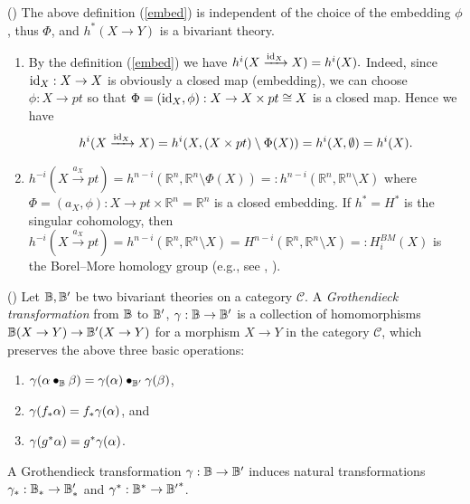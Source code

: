 \documentclass[a4paper]{amsart}
\begin{document}
\begin{thm}(\cite[p.34-p.38]{FM}) The above definition (\ref{embed}) is independent of the choice of the embedding $\phi$, thus $\Phi$, and $h^*(X \to Y)$ is a bivariant theory.
\end{thm}
\begin{rem} 
\begin{enumerate}
\item By the definition (\ref{embed}) we have
$h^i(X \xrightarrow {\operatorname{id}_X} X) = h^i(X).$
Indeed, since $\operatorname{id}_X: X \to X$ is obviously a closed map (embedding), we can choose $\phi:X \to pt$ so that
$\Phi=(\operatorname{id}_X, \phi):X \to X \times pt \cong X$ is a closed map. Hence %
we have 
$$h^i(X \xrightarrow {\operatorname{id}_X} X)= h^i(X, (X \times pt) \setminus \Phi(X))=h^i(X, \emptyset)=h^i(X).$$
\item $h^{-i}(X \xrightarrow {a_X} pt) = h^{n-i}(\mathbb R^n, \mathbb R^n \setminus \Phi(X))=:h^{n-i}(\mathbb R^n, \mathbb R^n \setminus X)$ where $\Phi=(a_X, \phi):X \to pt \times \mathbb R^n =\mathbb R^n$ is a closed embedding. If $h^*=H^*$ is the singular cohomology, then $h^{-i}(X \xrightarrow {a_X} pt) =h^{n-i}(\mathbb R^n, \mathbb R^n \setminus X) =H^{n-i}(\mathbb R^n, \mathbb R^n \setminus X) =:H^{BM}_i(X)$ is the Borel--More homology group (e.g., see \cite{Ful}, \cite[B.1]{PS}).
\end{enumerate}
\end{rem}
\begin{defn}
(\cite[\S 2.7 Grothendieck transformation]{FM}) \label{groth}
Let $\mathbb B, \mathbb B'$ be two bivariant theories on a category $\mathscr C$. 
A {\it Grothendieck transformation} from $\mathbb B$ to $\mathbb B'$, $\gamma : \mathbb B \to \mathbb B'$
is a collection of homomorphisms
$\mathbb B(X \to Y) \to \mathbb B'(X \to Y)$
for a morphism $X \to Y$ in the category $\mathscr C$, which preserves the above three basic operations: 
\begin{enumerate}
\item $\gamma (\alpha \bullet_{\mathbb B} \beta) = \gamma (\alpha) \bullet _{\mathbb B'} \gamma (\beta)$, 
\item $\gamma(f_{*}\alpha) = f_*\gamma (\alpha)$, and 
\item $\gamma (g^* \alpha) = g^* \gamma (\alpha)$. 
\end{enumerate}
\end{defn}

A Grothendieck transformation $\gamma: \mathbb B \to \mathbb B'$ induces natural transformations $\gamma_*: \mathbb B_* \to \mathbb B_*'$ and $\gamma^*: \mathbb B^* \to {\mathbb B'}^*$.
 
\end{document}

